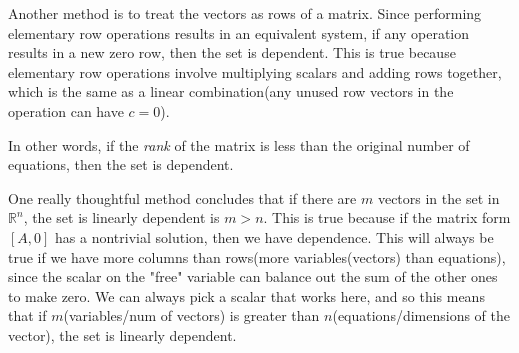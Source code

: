 \documentclass{article}
\begin{document}
Another method is to treat the vectors as rows of a matrix. Since performing elementary row operations results in an equivalent system, if any operation results in a new zero row, then the set is dependent. This is true because elementary row operations involve multiplying scalars and adding rows together, which is the same as a linear combination(any unused row vectors in the operation can have $c = 0$).

In other words, if the \textit{rank} of the matrix is less than the original number of equations, then the set is dependent.

One really thoughtful method concludes that if there are $m$ vectors in the set in $\mathbb{R}^n$, the set is linearly dependent is $m > n$. This is true because if the matrix form $[A,0]$ has a nontrivial solution, then we have dependence. This will always be true if we have more columns than rows(more variables(vectors) than equations), since the scalar on the "free" variable can balance out the sum of the other ones to make zero. We can always pick a scalar that works here, and so this means that if $m$(variables/num of vectors) is greater than $n$(equations/dimensions of the vector), the set is linearly dependent.
\setcounter{subsection}{4}
\end{document}
